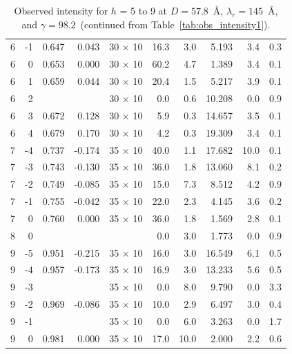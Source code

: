 \begin{table}[htbp]
\begin{tabular}{rrrrcrrrrr}
  6        & -1       & 0.647    & 0.043    & 30 $\times$ 10 & 16.3     & 3.0      & 5.193     & 3.4      & 0.3 \\
  6        & 0        & 0.653    & 0.000    & 30 $\times$ 10 & 60.2     & 4.7      & 1.389     & 3.4      & 0.1 \\
  6        & 1        & 0.659    & 0.044    & 30 $\times$ 10 & 20.4     & 1.5      & 5.217     & 3.9      & 0.1 \\
  6        & 2        &          &          & 30 $\times$ 10 & 0.0      & 0.6      & 10.208    & 0.0      & 0.9 \\
  6        & 3        & 0.672    & 0.128    & 30 $\times$ 10 & 5.9      & 0.3      & 14.657    & 3.5      & 0.1 \\
  6        & 4        & 0.679    & 0.170    & 30 $\times$ 10 & 4.2      & 0.3      & 19.309    & 3.4      & 0.1 \\
  7        & -4       & 0.737    & -0.174   & 35 $\times$ 10 & 40.0     & 1.1      & 17.682    & 10.0     & 0.1 \\
  7        & -3       & 0.743    & -0.130   & 35 $\times$ 10 & 36.0     & 1.8      & 13.060    & 8.1      & 0.2 \\
  7        & -2       & 0.749    & -0.085   & 35 $\times$ 10 & 15.0     & 7.3      & 8.512     & 4.2      & 0.9 \\
  7        & -1       & 0.755    & -0.042   & 35 $\times$ 10 & 22.0     & 2.3      & 4.145     & 3.6      & 0.2 \\
  7        & 0        & 0.760    & 0.000    & 35 $\times$ 10 & 36.0     & 1.8      & 1.569     & 2.8      & 0.1 \\
  8        & 0        &          &          &                & 0.0      & 3.0      & 1.773     & 0.0      & 0.9 \\
  9        & -5       & 0.951    & -0.215   & 35 $\times$ 10 & 16.0     & 3.0      & 16.549    & 6.1      & 0.5 \\
  9        & -4       & 0.957    & -0.173   & 35 $\times$ 10 & 16.9     & 3.0      & 13.233    & 5.6      & 0.5 \\
  9        & -3       &          &          & 35 $\times$ 10 & 0.0      & 8.0      & 9.790     & 0.0      & 3.3 \\
  9        & -2       & 0.969    & -0.086   & 35 $\times$ 10 & 10.0     & 2.9      & 6.497     & 3.0      & 0.4 \\
  9        & -1       &          &          & 35 $\times$ 10 & 0.0      & 6.0      & 3.263     & 0.0      & 1.7 \\
  9        & 0        & 0.981    & 0.000    & 35 $\times$ 10 & 17.0     & 10.0     & 2.000     & 2.2      & 0.6 \\
    \hline
  \end{tabular}
  \caption{Observed intensity for $h$ = 5 to 9 at $D=57.8$~\AA, $\lambda_r=145$~\AA, and 
  $\gamma=98.2$\textdegree\ (continued from Table~\ref{tab:obs_intensity1}).}
  \label{tab:obs_intensity2}
\end{table}

